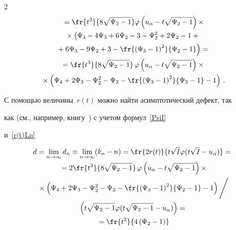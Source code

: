 \begin{multicols}{2}
\begin{multline}
{}=\fr{t^3}{8\sqrt{\Psi_2-1}}\varphi\left(u_\alpha-t\sqrt{\Psi_2-1}\right)\times

\\

{}\times\left(\Psi_4-4\Psi_3+6\Psi_2-3-\Psi^2_2+2\Psi_2-1+{}\right.\\

\left.{}+6\Psi_3-9\Psi_2+3

-\fr{\left(\Psi_3-1\right)^2}{\Psi_2-1}\right)={}\\

{}=

\fr{t^3}{8\sqrt{\Psi_2-1}}\,\varphi\left(u_\alpha-t\sqrt{\Psi_2-1}\right)\times{}\\

{}\times

\left(\Psi_4+2\Psi_3-\Psi^2_2-\Psi_2-\fr{\left(\Psi_3-1\right)^2}{\Psi_2-1}-1\right)\,.

\label{r(t)Ln}

\end{multline}

С помощью величины~$r(t)$ можно найти асимптотический дефект, так

как (см., например, книгу~\cite{Bening2000}) с учетом формул~\eqref{PsiI}

и~\eqref{r(t)Ln}



\begin{multline}

d=\lim\limits_{n\to\infty}

d_n\equiv\lim\limits_{n\to\infty}(k_n-n)=

\fr{2r(t)}{t\sqrt{I}\varphi(t\sqrt{I}-u_\alpha)}={}\\

{}=2\fr{t^3}{8\sqrt{\Psi_2-1}}\,\varphi

\left(u_\alpha-t\sqrt{\Psi_2-1}\right)\times\\

{}\times

\left(\Psi_4+2\Psi_3-\Psi^2_2-\Psi_2-\fr{\left(\Psi_3-1\right)^2}{\Psi_2-1}-1\right)\Bigg /{}\\

{}

\left(t\sqrt{\Psi_2-1}\varphi(t\sqrt{\Psi_2-1}-u_\alpha)\right)={}\\

{}=\fr{t^2}{4\left(\Psi_2-1\right)}


\end{multline}
\end{multicols}
